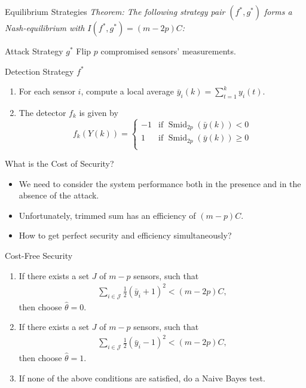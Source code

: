 \documentclass[10pt]{beamer}
\newcommand{\tikzdir}[1]{#1.tikz}
\newcommand{\inputtikz}[1]{}}
\DeclareMathOperator{\Smid}{Smid}
\begin{document}
\begin{frame}{Equilibrium Strategies}
  \it Theorem: The following strategy pair $(f^*,g^*)$ forms a Nash-equilibrium with $I(f^*,g^*) = (m-2p)C$:
  \begin{block}{Attack Strategy $g^*$}
    Flip $p$ compromised sensors' measurements.
  \end{block}
  \begin{block}{Detection Strategy $f^*$}
    \begin{enumerate}
    \item For each sensor $i$, compute a local average $ \bar y_i(k) = \sum_{t=1}^k y_i(t)$.
    \item The detector $f_k$ is given by
      \begin{displaymath}
        f_k(Y(k)) = \begin{cases}
          -1 &\text{if }\Smid_{2p}(\bar y(k))< 0\\
          1 &\text{if }\Smid_{2p}(\bar y(k))\geq 0\\
        \end{cases}
      \end{displaymath}
    \end{enumerate}
  \end{block}
\end{frame}

\begin{frame}{What is the Cost of Security?}
  \begin{itemize}
  \item We need to consider the system performance both in the presence and in the absence of the attack.
    \vspace{0.5cm}
    \begin{center}
      \inputtikz{fun_lim2}
    \end{center}
  \item Unfortunately, trimmed sum has an efficiency of $(m-p)C$.
  \item How to get perfect security and efficiency simultaneously?
  \end{itemize}
\end{frame}

\begin{frame}{Cost-Free Security}
  \begin{enumerate}
  \item If there exists a set $J$ of $m-p$ sensors, such that
    \begin{align*}
      \sum_{i\in \mathcal J}\frac{1}{2}(\bar y_i+1)^2 < (m-2p)C,
    \end{align*}
    then choose $\hat \theta = 0$. 
  \item If there exists a set $J$ of $m-p$ sensors, such that
    \begin{align*}
      \sum_{i\in \mathcal J}\frac{1}{2}(\bar y_i-1)^2 < (m-2p)C,
    \end{align*}
    then choose $\hat \theta = 1$. 
  \item If none of the above conditions are satisfied, do a Naive Bayes test.
  \end{enumerate}
\end{frame}
\end{document}
